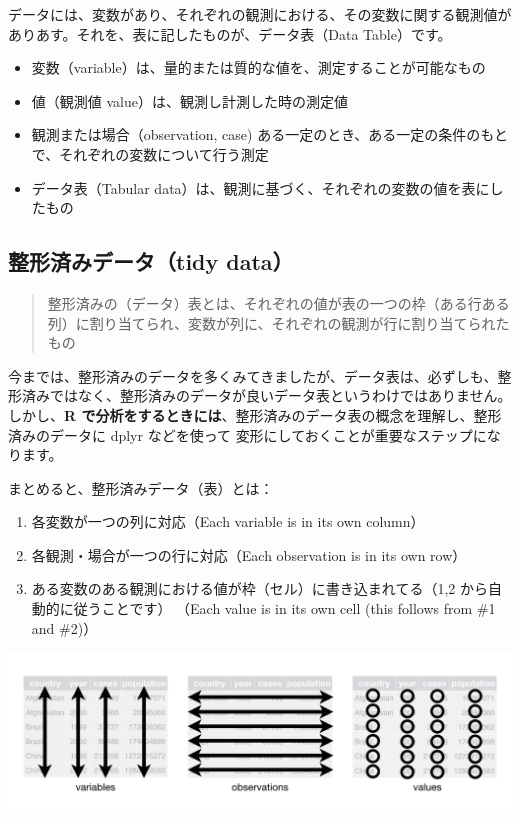 \documentclass[
  xelatex, ja=standard]{bxjsbook}
\providecommand{\tightlist}{%
  \setlength{\itemsep}{0pt}\setlength{\parskip}{0pt}}
\theoremstyle{definition}
\theoremstyle{definition}
\theoremstyle{definition}
\theoremstyle{definition}
\theoremstyle{remark}
\begin{document}
データには、変数があり、それぞれの観測における、その変数に関する観測値がありあす。それを、表に記したものが、データ表（Data Table）です。

\begin{itemize}
\tightlist
\item
  変数（variable）は、量的または質的な値を、測定することが可能なもの
\item
  値（観測値 value）は、観測し計測した時の測定値
\item
  観測または場合（observation, case) ある一定のとき、ある一定の条件のもとで、それぞれの変数について行う測定
\item
  データ表（Tabular data）は、観測に基づく、それぞれの変数の値を表にしたもの
\end{itemize}

\hypertarget{ux6574ux5f62ux6e08ux307fux30c7ux30fcux30bftidy-data}{%
\subsection{整形済みデータ（tidy data）}\label{ux6574ux5f62ux6e08ux307fux30c7ux30fcux30bftidy-data}}

\begin{quote}
整形済みの（データ）表とは、それぞれの値が表の一つの枠（ある行ある列）に割り当てられ、変数が列に、それぞれの観測が行に割り当てられたもの
\end{quote}

今までは、整形済みのデータを多くみてきましたが、データ表は、必ずしも、整形済みではなく、整形済みのデータが良いデータ表というわけではありません。しかし、\textbf{R で分析をするときには}、整形済みのデータ表の概念を理解し、整形済みのデータに dplyr などを使って 変形にしておくことが重要なステップになります。

まとめると、整形済みデータ（表）とは：

\begin{enumerate}
\def\labelenumi{\arabic{enumi}.}
\tightlist
\item
  各変数が一つの列に対応（Each variable is in its own column）
\item
  各観測・場合が一つの行に対応（Each observation is in its own row）
\item
  ある変数のある観測における値が枠（セル）に書き込まれてる（1,2 から自動的に従うことです） （Each value is in its own cell (this follows from \#1 and \#2)）
\end{enumerate}

\includegraphics[width=1\linewidth]{./data/tidy-1}
\end{document}
